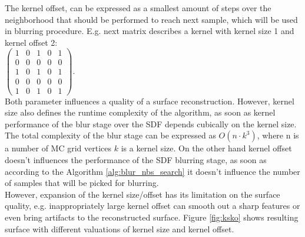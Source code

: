 The kernel offset, can be expressed as a smallest amount of steps over the neighborhood that should be performed to reach next sample, which will be used in blurring procedure. E.g. next matrix describes a kernel with kernel size 1 and kernel offset 2: \\
$
\begin{pmatrix}
	1 & 0 & 1 & 0 & 1\\
	0 & 0 & 0 & 0 & 0\\
	1 & 0 & 1 & 0 & 1\\
	0 & 0 & 0 & 0 & 0\\
	1 & 0 & 1 & 0 & 1
\end{pmatrix}
$.\\
Both parameter influences a quality of a surface reconstruction. However, kernel size also defines the runtime complexity of the algorithm, as soon as kernel performance of the blur stage over the SDF depends cubically on the kernel size. The total complexity of the blur stage can be expressed as $O(n\cdot k^3)$, where n is a number of MC grid vertices $k$ is a kernel size. On the other hand kernel offset doesn't influences the performance of the SDF blurring stage, as soon as according to the Algorithm \ref{alg:blur_nbs_search} it doesn't influence the number of samples that will be picked for blurring.\\
However, expansion of the kernel size/offset has its limitation on the surface quality, e.g. inappropriately large kernel offset can smooth out a sharp features or even bring artifacts to the reconstructed surface. Figure \ref{fig:ksko} shows resulting surface with different valuations of kernel size and kernel offset.\\
